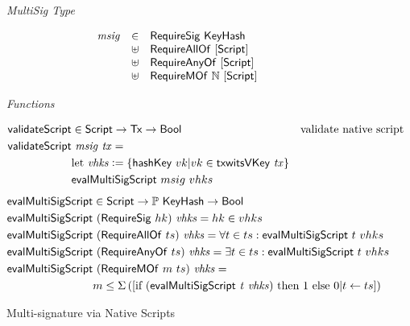 \begin{figure*}[hbt]
  \emph{MultiSig Type}

  \begin{equation*}
    \begin{array}{rll}
      \mathit{msig} & \in & \mathsf{RequireSig}~\mathsf{KeyHash}\\
      & \uplus &
         \mathsf{RequireAllOf}~[\mathsf{Script}] \\
      & \uplus&
         \mathsf{RequireAnyOf}~[\mathsf{Script}] \\
      & \uplus&
        \mathsf{RequireMOf}~\mathbb{N}~[\mathsf{Script}]
    \end{array}
  \end{equation*}

  \emph{Functions}

  \begin{align*}
    \mathsf{validateScript} & \in\mathsf{Script}\to\mathsf{Tx}\to\mathsf{Bool} & \text{validate native
                                                          script} \\
    \mathsf{validateScript} & ~\mathit{msig}~\mathit{tx}= \\
                         & \textrm{let}~\mathit{vhks}\mathrel{\mathop:}= \{\mathsf{hashKey}~vk \vert
                           vk \in \mathsf{txwitsVKey}~\mathit{tx}\} \\
                         & \mathsf{evalMultiSigScript}~msig~vhks\\
  \end{align*}
  \begin{align*}
    \mathsf{evalMultiSigScript} & \in\mathsf{Script}\to\mathbb{P}~\mathsf{KeyHash}\to\mathsf{Bool} & \\
    \mathsf{evalMultiSigScript} & ~(\mathsf{RequireSig}~hk)~\mathit{vhks} =  hk \in vhks \\
    \mathsf{evalMultiSigScript} & ~(\mathsf{RequireAllOf}~ts)~\mathit{vhks} =
                              \forall t \in ts: \mathsf{evalMultiSigScript}~t~vhks\\
    \mathsf{evalMultiSigScript} & ~(\mathsf{RequireAnyOf}~ts)~\mathit{vhks} =
                              \exists t \in ts: \mathsf{evalMultiSigScript}~t~vhks\\
    \mathsf{evalMultiSigScript} & ~(\mathsf{RequireMOf}~m~ts)~\mathit{vhks} = \\
                             & m \leq \Sigma
                               \left(
                               [\textrm{if}~(\mathsf{evalMultiSigScript}~\mathit{t}~\mathit{vhks})~
                               \textrm{then}~1~\textrm{else}~0\vert t \leftarrow ts]
                               \right)
  \end{align*}

  \caption{Multi-signature via Native Scripts}
  \label{fig:types-msig}
\end{figure*}

\clearpage
